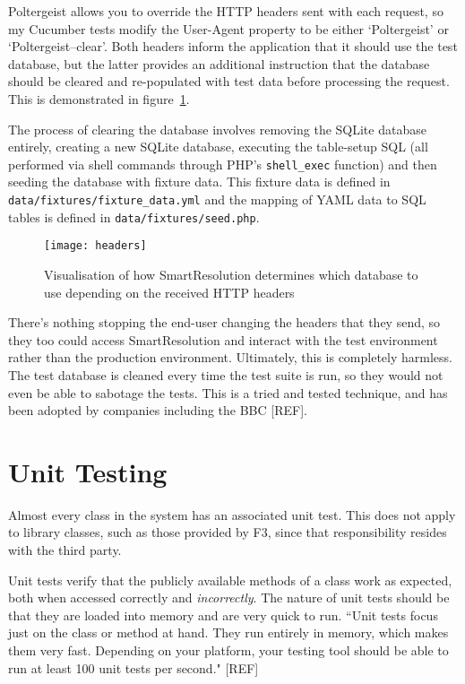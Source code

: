 Poltergeist allows you to override the HTTP headers sent with each request, so my Cucumber tests modify the User-Agent property to be either `Poltergeist' or `Poltergeist--clear'. Both headers inform the application that it should use the test database, but the latter provides an additional instruction that the database should be cleared and re-populated with test data before processing the request. This is demonstrated in figure~\ref{uml:headers}.

The process of clearing the database involves removing the SQLite database entirely, creating a new SQLite database, executing the table-setup SQL (all performed via shell commands through PHP's \lstinline{shell_exec} function) and then seeding the database with fixture data. This fixture data is defined in \lstinline{data/fixtures/fixture_data.yml} and the mapping of YAML data to SQL tables is defined in \lstinline{data/fixtures/seed.php}.

\begin{figure}[h!]
  \centering
    \ifimages
    \texttt{[image: headers]}
    \fi
  \caption{Visualisation of how SmartResolution determines which database to use depending on the received HTTP headers}
  \label{uml:headers}
\end{figure}

There's nothing stopping the end-user changing the headers that they send, so they too could access SmartResolution and interact with the test environment rather than the production environment. Ultimately, this is completely harmless. The test database is cleaned every time the test suite is run, so they would not even be able to sabotage the tests. This is a tried and tested technique, and has been adopted by companies including the BBC [REF].

\section{Unit Testing}

Almost every class in the system has an associated unit test. This does not apply to library classes, such as those provided by F3, since that responsibility resides with the third party.

Unit tests verify that the publicly available methods of a class work as expected, both when accessed correctly and \emph{incorrectly}. The nature of unit tests should be that they are loaded into memory and are very quick to run. ``Unit tests focus just on the class or method at hand. They run entirely in memory, which makes them very fast. Depending on your platform, your testing tool should be able to run at least 100 unit tests per second." [REF] %

